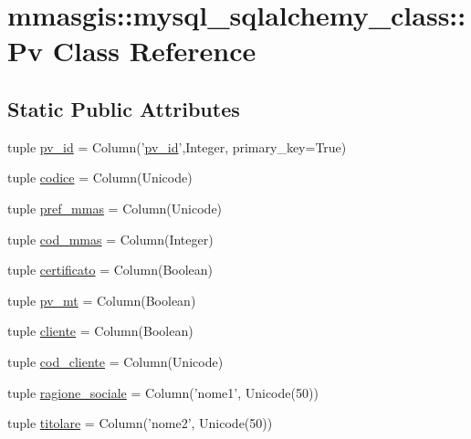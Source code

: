 \hypertarget{classmmasgis_1_1mysql__sqlalchemy__class_1_1Pv}{
\section{mmasgis::mysql\_\-sqlalchemy\_\-class::Pv Class Reference}
\label{classmmasgis_1_1mysql__sqlalchemy__class_1_1Pv}
}
\subsection*{Static Public Attributes}
\begin{DoxyCompactItemize}
\item 
tuple \hyperlink{classmmasgis_1_1mysql__sqlalchemy__class_1_1Pv_a1870e0e9c1186bf785545c9c5ded2b61}{pv\_\-id} = Column('\hyperlink{classmmasgis_1_1mysql__sqlalchemy__class_1_1Pv_a1870e0e9c1186bf785545c9c5ded2b61}{pv\_\-id}',Integer, primary\_\-key=True)
\item 
tuple \hyperlink{classmmasgis_1_1mysql__sqlalchemy__class_1_1Pv_a2f3c5ac2b2e12d4da0cfec51ede5a61b}{codice} = Column(Unicode)
\item 
tuple \hyperlink{classmmasgis_1_1mysql__sqlalchemy__class_1_1Pv_a297d88858ae29fc942723e13262e5498}{pref\_\-mmas} = Column(Unicode)
\item 
tuple \hyperlink{classmmasgis_1_1mysql__sqlalchemy__class_1_1Pv_a5dad0fb51aea5c29768eefd7e260f602}{cod\_\-mmas} = Column(Integer)
\item 
tuple \hyperlink{classmmasgis_1_1mysql__sqlalchemy__class_1_1Pv_abf5e2f2735931b010673d4d24cbc2d62}{certificato} = Column(Boolean)
\item 
tuple \hyperlink{classmmasgis_1_1mysql__sqlalchemy__class_1_1Pv_a594818585fc4d567c939aed7046905e3}{pv\_\-mt} = Column(Boolean)
\item 
tuple \hyperlink{classmmasgis_1_1mysql__sqlalchemy__class_1_1Pv_aebd97397202c1b2bbadc4ac3849dec5e}{cliente} = Column(Boolean)
\item 
tuple \hyperlink{classmmasgis_1_1mysql__sqlalchemy__class_1_1Pv_a1f08533b7746a74107f5b45d5458d330}{cod\_\-cliente} = Column(Unicode)
\item 
tuple \hyperlink{classmmasgis_1_1mysql__sqlalchemy__class_1_1Pv_a30f1175b6b3e41355f659cb5009579fe}{ragione\_\-sociale} = Column('nome1', Unicode(50))
\item 
tuple \hyperlink{classmmasgis_1_1mysql__sqlalchemy__class_1_1Pv_a5d322b95112b730932468f017950a09b}{titolare} = Column('nome2', Unicode(50))

\end{DoxyCompactItemize}
